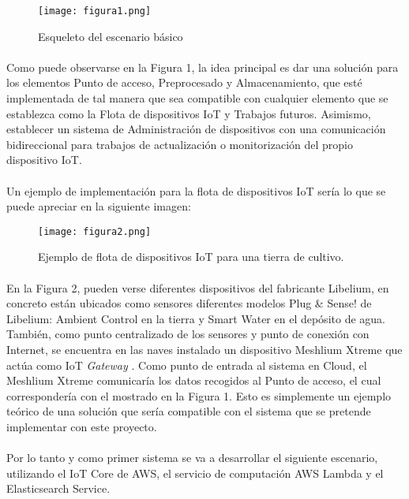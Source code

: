 \documentclass[../../memoria.tex]{subfiles}
\begin{document}
\begin{figure}[H]
    \centering
    \texttt{[image: figura1.png]}
    \caption{Esqueleto del escenario básico}
    \label{fig:figura1}
\end{figure}

\paragraph{}
Como puede observarse en la Figura 1, la idea principal es dar una solución para los elementos Punto de acceso, Preprocesado y Almacenamiento, que esté implementada de tal manera que sea compatible con cualquier elemento que se establezca como la Flota de dispositivos IoT y Trabajos futuros. Asimismo, establecer un sistema de Administración de dispositivos con una comunicación bidireccional para trabajos de actualización o monitorización del propio dispositivo IoT.

\paragraph{}
Un ejemplo de implementación para la flota de dispositivos IoT sería lo que se puede apreciar en la siguiente imagen:

\begin{figure}[H]
    \centering
    \texttt{[image: figura2.png]}
    \caption{Ejemplo de flota de dispositivos IoT para una tierra de cultivo.}
    \label{fig:figura2}
\end{figure}

\paragraph{}
En la Figura 2, pueden verse diferentes dispositivos del fabricante Libelium, en concreto están ubicados como sensores diferentes modelos Plug \& Sense! de Libelium: Ambient Control en la tierra y Smart Water en el depósito de agua. También, como punto centralizado de los sensores y punto de conexión con Internet, se encuentra en las naves instalado un dispositivo Meshlium Xtreme que actúa como IoT \textit{Gateway} \cite{libelium}. Como punto de entrada al sistema en Cloud, el Meshlium Xtreme comunicaría los datos recogidos al Punto de acceso, el cual correspondería con el mostrado en la Figura 1. Esto es simplemente un ejemplo teórico de una solución que sería compatible con el sistema que se pretende implementar con este proyecto.

\paragraph{}
Por lo tanto y como primer sistema se va a desarrollar el siguiente escenario, utilizando el IoT Core de AWS, el servicio de computación AWS Lambda y el Elasticsearch Service.
\end{document}
